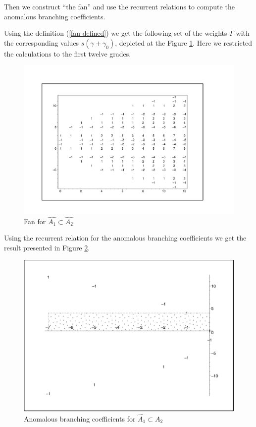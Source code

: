 \documentclass[a4paper,12pt]{article}
\theoremstyle{definition} \newtheorem{Def}{Definition}
\begin{document}
Then we construct ``the fan'' and use the recurrent relations to compute the anomalous branching coefficients.

Using the definition (\ref{fan-defined}) we get the following set of
the weights $\Gamma$ with the corresponding values $s(\gamma+\gamma_0)$, depicted at the Figure \ref{fig:AffineA2A1Fan}.
Here we restricted the calculations to the first twelve grades.
\begin{figure}[p]
  \centering
  \includegraphics[width=130mm]{AffineA2_A1_fan.pdf}
  \caption{Fan for $\hat{A_1}\subset \hat{A_2}$}
  \label{fig:AffineA2A1Fan}
\end{figure}

Using the recurrent relation for the anomalous branching coefficients we get the result presented in Figure \ref{fig:AffineA2_A1_branching}. 
\begin{figure}[p]
  \centering
  \includegraphics[width=130mm]{AffineA2_A1_branching.pdf}
  \caption{Anomalous branching coefficients for $\hat{A_1}\subset \hat{A_2}$}
  \label{fig:AffineA2_A1_branching}
\end{figure}
\end{document}
